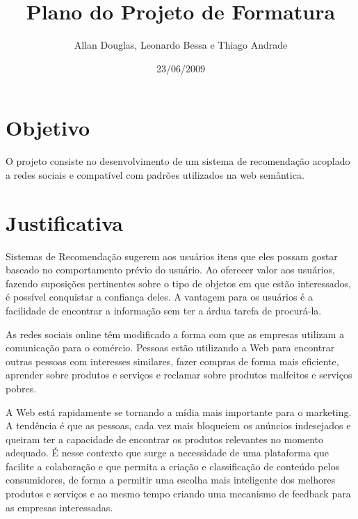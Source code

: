 \documentclass[]{article}
\title{Plano do Projeto de Formatura}
\author{Allan Douglas, Leonardo Bessa e Thiago Andrade  }
\date{23/06/2009}
\begin{document}
\ifpdf
{}
\else
{}
\fi

\maketitle


\section{Objetivo} %
\label{sec:objetivo}

 O projeto consiste no desenvolvimento de um sistema de recomendação acoplado a redes sociais e compatível com padrões utilizados na web semântica.


\section{Justificativa} %
\label{sec:objetivos_e_justificativas}

Sistemas de Recomendação sugerem aos usuários itens que eles possam gostar baseado no comportamento prévio do usuário. Ao oferecer valor aos usuários, fazendo suposições pertinentes sobre o tipo de objetos em que estão interessados, é possível conquistar a confiança deles. A vantagem para os usuários é a facilidade de encontrar a informação sem ter a árdua tarefa de procurá-la.

As redes sociais online têm modificado a forma com que as empresas utilizam a comunicação para o comércio. Pessoas estão utilizando a Web para encontrar outras pessoas com interesses similares, fazer compras de forma mais eficiente, aprender sobre produtos e serviços e reclamar sobre produtos malfeitos e serviços pobres.

A Web está rapidamente se tornando a mídia mais importante para o marketing. A tendência é que as pessoas, cada vez mais bloqueiem os anúncios indesejados e queiram ter a capacidade de encontrar os produtos relevantes no momento adequado. É nesse contexto que surge a necessidade de uma plataforma que facilite a colaboração e que permita a criação e classificação de conteúdo pelos consumidores, de forma a permitir uma escolha mais inteligente dos melhores produtos e serviços e ao mesmo tempo criando uma mecanismo de feedback para as empresas interessadas.
\end{document}
